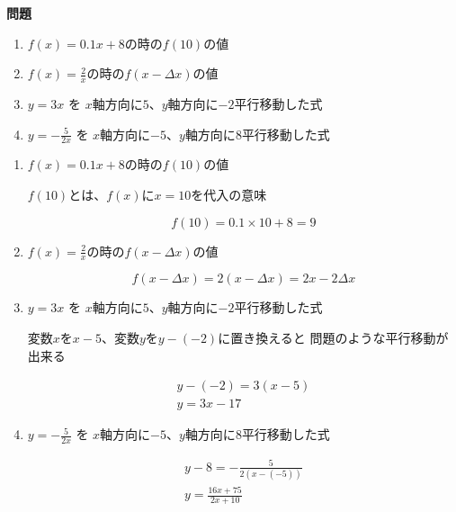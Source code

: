 \documentclass[12pt,b5paper]{ltjsarticle}
\begin{document}
\textbf{問題}
\begin{enumerate}
 \item $f(x)=0.1x + 8$の時の$f(10)$の値
 \item $f(x)=\frac{2}{x}$の時の$f(x-\Delta x)$の値
 \item $y=3x$ を $x$軸方向に$5$、$y$軸方向に$-2$平行移動した式
 \item $y=-\frac{5}{2x}$ を $x$軸方向に$-5$、$y$軸方向に$8$平行移動した式
\end{enumerate}

\hrulefill

\begin{enumerate}
 \item $f(x)=0.1x + 8$の時の$f(10)$の値

       $f(10)$とは、$f(x)$に$x=10$を代入の意味

       \begin{equation}
        f(10) = 0.1 \times 10 + 8 =9
       \end{equation}

 \item $f(x)=\frac{2}{x}$の時の$f(x-\Delta x)$の値

       \begin{equation}
        f(x-\Delta x) = 2(x-\Delta x) = 2x -2\Delta x
       \end{equation}

 \item $y=3x$ を $x$軸方向に$5$、$y$軸方向に$-2$平行移動した式

       変数$x$を$x-5$、変数$y$を$y-(-2)$に置き換えると
       問題のような平行移動が出来る

       \begin{gather}
        y-(-2) = 3(x-5)\\
        y = 3x-17
       \end{gather}

 \item $y=-\frac{5}{2x}$ を $x$軸方向に$-5$、$y$軸方向に$8$平行移動した式

       \begin{gather}
        y -8 =-\frac{5}{2(x-(-5))}\\
        y =\frac{16x+75}{2x+10}
       \end{gather}

\end{enumerate}
\end{document}
